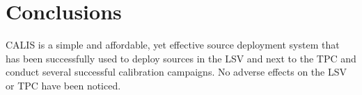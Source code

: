 \section{Conclusions}\label{sec:Conclusions}\label{sec:Conclusion}
CALIS is a simple and affordable, yet effective source deployment system that has been successfully used to deploy sources in the LSV and next to the TPC and conduct several successful calibration campaigns. No adverse effects on the LSV or TPC have been noticed.


